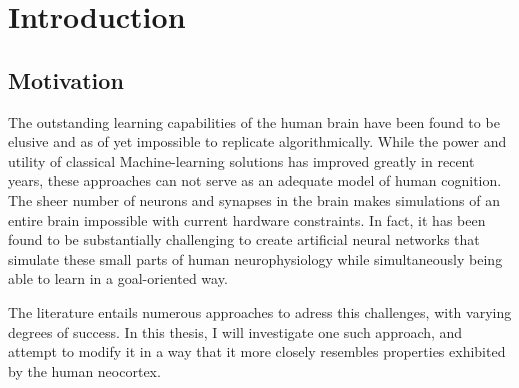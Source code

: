 
\chapter{Introduction}



\section{Motivation}


The outstanding learning capabilities of the human brain have been found to be elusive
and as of yet impossible to replicate algorithmically. While the power and utility of classical
Machine-learning solutions has improved greatly in recent years, these approaches can not serve as 
an adequate model of human cognition. 
The sheer number of neurons and synapses in the brain makes simulations
of an entire brain impossible with current hardware constraints. 
In fact, it has been found to be substantially challenging to
create artificial neural networks that simulate these small parts of human neurophysiology while simultaneously being
able to learn in a goal-oriented way. 



The literature entails numerous approaches to adress this challenges, with varying degrees of success. In this thesis,
I will investigate one such approach, and attempt to modify it in a way that it more closely resembles properties 
exhibited by the human neocortex.